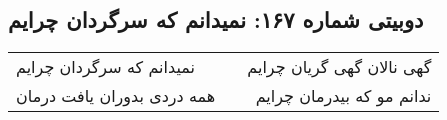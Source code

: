 \begin{center}
\section*{دوبیتی شماره ۱۶۷: نمیدانم که سرگردان چرایم}
\label{sec:167}
\begin{longtable}{l p{0.5cm} r}
نمیدانم که سرگردان چرایم
&&
گهی نالان گهی گریان چرایم
\\
همه دردی بدوران یافت درمان
&&
ندانم مو که بیدرمان چرایم
\\
\end{longtable}
\end{center}
